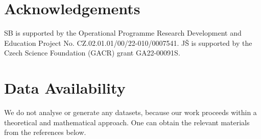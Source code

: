 \documentclass[a4paper,10.9pt]{amsart}
\theoremstyle{definition}
\theoremstyle{remark}
\numberwithin{equation}{section}
\renewcommand{\=}{\stackrel \Sigma =}
\begin{document}

\maketitle

\pagestyle{myheadings} 



\tableofcontents

\section*{Acknowledgements}
SB is supported by the Operational Programme Research Development and Education Project No. CZ.02.01.01/00/22-010/0007541. J\v{S} is supported by the Czech Science Foundation (GACR) grant GA22-00091S.

\section*{Data Availability}
We do not analyse or generate any datasets, because our work proceeds within a theoretical and mathematical approach. One can obtain the relevant materials from the references below.

%
\end{document}
